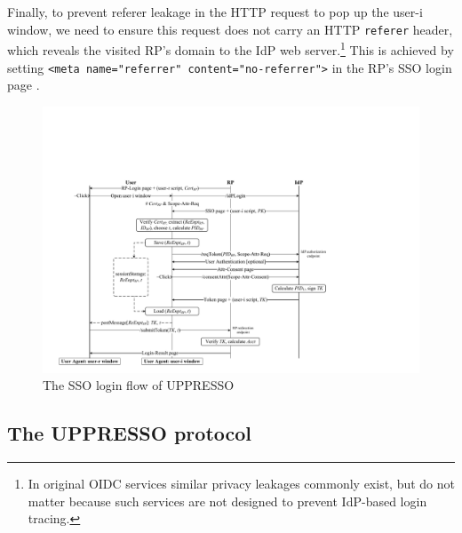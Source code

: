 Finally, to prevent referer leakage in the HTTP request to pop up the user-i window,
 we need to ensure this request does not carry an HTTP \texttt{referer} header, which reveals the visited RP's domain to the IdP web server.\footnote{In original OIDC services similar privacy leakages commonly exist, but do not matter because such services are not designed to prevent IdP-based login tracing.} %
%
This is achieved by setting
\verb+<meta name="referrer" content="no-referrer">+
in the RP's SSO login page \cite{referer_policy}.

\begin{figure}[htb]
  \centering
  \includegraphics[width=0.82\linewidth]{fig/pop-up-process.pdf}
  \caption{The SSO login flow of UPPRESSO}
  \label{fig:process}
\end{figure}



\subsection{The UPPRESSO protocol}
\label{implementations}

